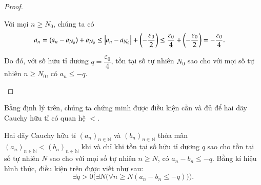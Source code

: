 \begin{proof}
\begin{enumerate}[label={\textbf{Khả năng \arabic*.}},itemindent=2cm]
              Với mọi $n\geq N_{0}$, chúng ta có
              \begin{align*}
                  a_{n} & = (a_{n} - a_{N_{0}}) + a_{N_{0}} \leq \left\vert{a_{n} - a_{N_{0}}}\right\vert + \left(-\frac{\varepsilon_{0}}{2}\right) \leq \frac{\varepsilon_{0}}{4} + \left(-\frac{\varepsilon_{0}}{2}\right) = -\frac{\varepsilon_{0}}{4}.
              \end{align*}

              Do đó, với số hữu tỉ dương $q = \dfrac{\varepsilon_{0}}{4}$, tồn tại số tự nhiên $N_{0}$ sao cho với mọi số tự nhiên $n\geq N_{0}$, có $a_{n}\leq -q$.
    \end{enumerate}
\end{proof}

Bằng định lý trên, chúng ta chứng minh được điều kiện cần và đủ để hai dãy Cauchy hữu tỉ có quan hệ $<$.

\begin{appendixthm}\label{appendixthm:strictly-precedence-cauchy-sequence}
    Hai dãy Cauchy hữu tỉ ${(a_{n})}_{n\in\mathbb{N}}$ và ${(b_{n})}_{n\in\mathbb{N}}$ thỏa mãn ${(a_{n})}_{n\in\mathbb{N}} < {(b_{n})}_{n\in\mathbb{N}}$ khi và chỉ khi tồn tại số hữu tỉ dương $q$ sao cho tồn tại số tự nhiên $N$ sao cho với mọi số tự nhiên $n\geq N$, có $a_{n} - b_{n}\leq -q$. Bằng kí hiệu hình thức, điều kiện trên được viết như sau:
    \[
        \exists q > 0 \Biggl( \exists N \bigl( \forall n\geq N (a_{n} - b_{n}\leq -q) \bigr) \Biggr).
    \]
\end{appendixthm}

